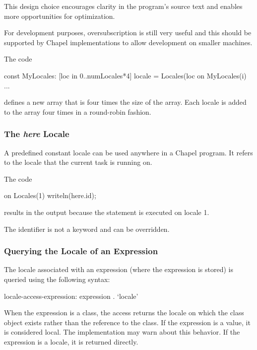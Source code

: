 \begin{rationale}
This design choice encourages clarity in the program's source text and
enables more opportunities for optimization.

For development purposes, oversubscription is still very useful and
this should be supported by Chapel implementations to allow
development on smaller machines.
\end{rationale}

\begin{example}
The code
\begin{chapel}
const MyLocales: [loc in 0..numLocales*4] locale = Locales(loc%
on MyLocales(i) ...
\end{chapel}
defines a new array  that is four times the size of
the  array.  Each locale is added to
the  array four times in a round-robin fashion.
\end{example}

\subsubsection{The {\em here} Locale}
\label{here}

A predefined constant locale  can be used anywhere in a
Chapel program.  It refers to the locale that the current task is
running on.

\begin{example}
The code
\begin{chapel}
on Locales(1) {
  writeln(here.id);
}
\end{chapel}
results in the output  because the  statement is
executed on locale 1.
\end{example}

The identifier  is not a keyword and can be overridden.

\subsubsection{Querying the Locale of an Expression}
\label{Querying_the_Locale_of_a_Variable}

The locale associated with an expression (where the expression is
stored) is queried using the following syntax:
\begin{syntax}
locale-access-expression:
  expression . `locale'
\end{syntax}
When the expression is a class, the access returns the locale on which
the class object exists rather than the reference to the class.  If
the expression is a value, it is considered local.  The implementation
may warn about this behavior.  If the expression is a locale, it is
returned directly.

